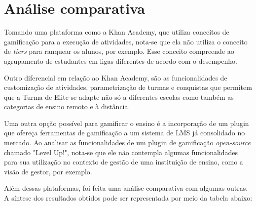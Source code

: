 \chapter{Análise comparativa}
Tomando uma plataforma como a Khan Academy, que utiliza conceitos de gamificação para a execução de atividades, nota-se que ela não utiliza o conceito de \textit{tiers} para ranquear os alunos, por exemplo. Esse conceito compreende ao agrupamento de estudantes em ligas diferentes de acordo com o desempenho.

Outro diferencial em relação ao Khan Academy, são as funcionalidades de customização de atividades, parametrização de turmas e conquistas que permitem que a Turma de Elite se adapte não só a diferentes escolas como também as categorias de ensino remoto e à distância.

Uma outra opção possível para gamificar o ensino é a incorporação de um plugin que ofereça ferramentas de gamificação a um sistema de LMS já consolidado no mercado. Ao analisar as funcionalidades de um plugin de gamificação \textit{open-source} chamado "Level Up!", nota-se que ele não contempla algumas funcionalidades para sua utilização no contexto de gestão de uma instituição de ensino, como a visão de gestor, por exemplo.

Além dessas plataformas, foi feita uma análise comparativa com algumas outras. A síntese dos resultados obtidos pode ser representada por meio da tabela abaixo:

